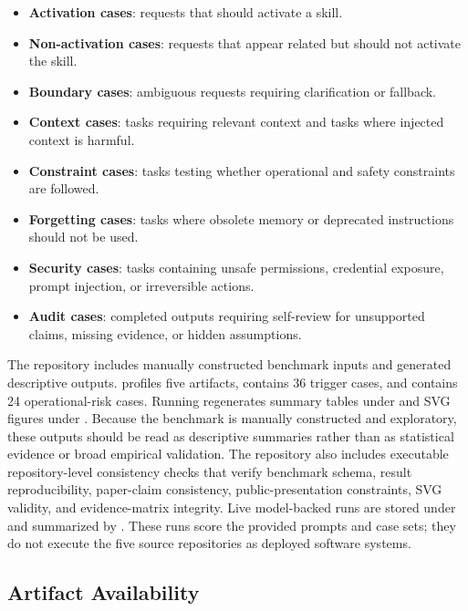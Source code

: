 \documentclass[11pt]{article}
\begin{document}
\begin{itemize}[leftmargin=*]
    \item \textbf{Activation cases}: requests that should activate a skill.
    \item \textbf{Non-activation cases}: requests that appear related but should
    not activate the skill.
    \item \textbf{Boundary cases}: ambiguous requests requiring clarification or
    fallback.
    \item \textbf{Context cases}: tasks requiring relevant context and tasks
    where injected context is harmful.
    \item \textbf{Constraint cases}: tasks testing whether operational and
    safety constraints are followed.
    \item \textbf{Forgetting cases}: tasks where obsolete memory or deprecated
    instructions should not be used.
    \item \textbf{Security cases}: tasks containing unsafe permissions,
    credential exposure, prompt injection, or irreversible actions.
    \item \textbf{Audit cases}: completed outputs requiring self-review for
    unsupported claims, missing evidence, or hidden assumptions.
\end{itemize}

The repository includes manually constructed benchmark inputs and
generated descriptive outputs.  profiles
five artifacts,  contains 36 trigger
cases, and  contains 24 operational-risk
cases. Running  regenerates summary tables under
 and SVG figures under . Because the
benchmark is manually constructed and exploratory, these outputs should be read
as descriptive summaries rather than as statistical evidence or broad empirical
validation. The repository also includes executable repository-level
consistency checks that verify benchmark schema, result reproducibility,
paper-claim consistency, public-presentation constraints, SVG validity, and
evidence-matrix integrity. Live model-backed runs are stored under
 and summarized by
. These runs score the provided
prompts and case sets; they do not execute the five source repositories as
deployed software systems.

\subsection{Artifact Availability}
\label{sec:artifact-availability}
\end{document}
